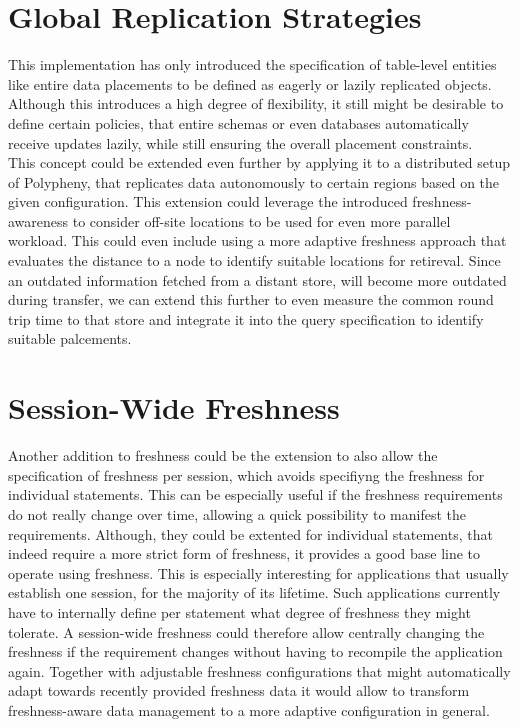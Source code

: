 \tocless\section{Global Replication Strategies}
This implementation has only introduced the specification of table-level entities like entire data placements to be defined as eagerly or lazily replicated objects.
Although this introduces a high degree of flexibility, it still might be desirable to define certain policies, that entire schemas or even databases automatically 
receive updates lazily, while still ensuring the overall placement constraints.\\
This concept could be extended even further by applying it to a distributed setup of Polypheny, that replicates data autonomously to certain regions based on the given 
configuration. 
This extension could leverage the introduced freshness-awareness to consider off-site locations to be used for even more parallel workload.
This could even include using a more adaptive freshness approach that evaluates the distance to a node to identify suitable locations for retireval.
Since an outdated information fetched from a distant store, will become more outdated during transfer, we can
extend this further to even measure the common round trip time to that store and integrate it into the query specification to identify suitable palcements.

 





\tocless\section{Session-Wide Freshness}
Another addition to freshness could be the extension to also allow the specification
of freshness per session, which avoids specifiyng the freshness for individual statements.
This can be especially useful if the freshness requirements do not really change over time, allowing a quick
possibility to manifest the requirements. Although, they could be extented for individual statements,
that indeed require a more strict form of freshness, it provides a good base line to operate using freshness.
This is especially interesting for applications that usually establish one session, for the majority of its lifetime. 
Such applications currently have to internally define per statement what degree of freshness they might tolerate. 
A session-wide freshness could therefore allow centrally changing the freshness if the requirement changes without having to recompile the application again.
Together with adjustable freshness configurations that might automatically adapt towards recently provided freshness data it would allow
to transform freshness-aware data management to a more adaptive configuration in general.



